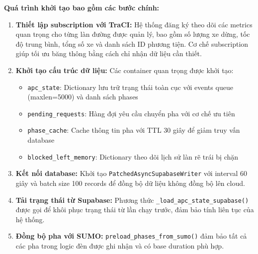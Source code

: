 \documentclass[12pt,a4paper,oneside]{report}
\begin{document}
\textbf{Quá trình khởi tạo bao gồm các bước chính:}

\begin{enumerate}
    \item \textbf{Thiết lập subscription với TraCI:} Hệ thống đăng ký theo dõi các metrics quan trọng cho từng làn đường được quản lý, bao gồm số lượng xe dừng, tốc độ trung bình, tổng số xe và danh sách ID phương tiện. Cơ chế subscription giúp tối ưu băng thông bằng cách chỉ nhận dữ liệu cần thiết.
    
    \item \textbf{Khởi tạo cấu trúc dữ liệu:} Các container quan trọng được khởi tạo:
    \begin{itemize}
        \item \texttt{apc\_state}: Dictionary lưu trữ trạng thái toàn cục với events queue (maxlen=5000) và danh sách phases
        \item \texttt{pending\_requests}: Hàng đợi yêu cầu chuyển pha với cơ chế ưu tiên
        \item \texttt{phase\_cache}: Cache thông tin pha với TTL 30 giây để giảm truy vấn database
        \item \texttt{blocked\_left\_memory}: Dictionary theo dõi lịch sử làn rẽ trái bị chặn
    \end{itemize}
    
    \item \textbf{Kết nối database:} Khởi tạo \texttt{PatchedAsyncSupabaseWriter} với interval 60 giây và batch size 100 records để đồng bộ dữ liệu không đồng bộ lên cloud.
    
    \item \textbf{Tải trạng thái từ Supabase:} Phương thức \texttt{\_load\_apc\_state\_supabase()} được gọi để khôi phục trạng thái từ lần chạy trước, đảm bảo tính liên tục của hệ thống.
    
    \item \textbf{Đồng bộ pha với SUMO:} \texttt{preload\_phases\_from\_sumo()} đảm bảo tất cả các pha trong logic đèn được ghi nhận và có base duration phù hợp.
\end{enumerate}
\end{document}
